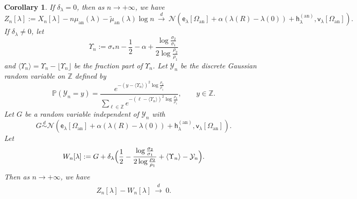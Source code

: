 \documentclass[a4paper]{article}
\newtheorem{corollary}[theorem]{Corollary}
\numberwithin{equation}{section}
\begin{document}
\begin{corollary}
\label{theorem:annular-smooth-limit-law}
If $\delta_\lambda=0$, then as $n\to+\infty$, we have
\begin{equation}
Z_n[\lambda]:=X_n[\lambda]-n\mu_{\mathrm{an}}(\lambda)
-\widetilde\mu_{\mathrm{an}}(\lambda)\log n
\ \xrightarrow{\ d\ }\
\mathcal N\!\left(
\mathsf e_\lambda[\Omega_{\mathrm{an}}]
+\alpha(\lambda(R)-\lambda(0))
+\mathsf h_\lambda^{(\mathrm{an})},
\mathsf v_\lambda[\Omega_{\mathrm{an}}]
\right).
\label{eq:annular-smooth-gaussian-limit}
\end{equation}
If $\delta_\lambda\ne0$, let 
\[
\Upsilon_n:=\sigma_{\ast}n-\frac{1}{2}-\alpha+\frac{\log\frac{\sigma_2}{\sigma_1}}{2\log \frac{\rho_2}{\rho_1}}
\]
and $\langle\Upsilon_n\rangle=\Upsilon_n-\lfloor \Upsilon_n\rfloor$ be the fraction part of $\Upsilon_n$.
Let $\mathcal{Y}_n$ be the discrete Gaussian random variable on $\mathbb{Z}$ defined by 
\begin{equation}
\mathbb P(\mathcal{Y}_n=y)  =\frac{e^{-(y-\langle\Upsilon_n\rangle)^2\log\frac{\rho_2}{\rho_1}}}{\displaystyle\sum_{\ell\in\mathbb Z}
e^{-(\ell-\langle\Upsilon_n\rangle)^2\log\frac{\rho_2}{\rho_1}}},
\qquad y\in\mathbb Z. 
\end{equation}
Let $G$ be a random variable independent of $\mathcal{Y}_n$ with
\[
G\overset{d}{\sim}\mathcal N\!\left(
\mathsf e_\lambda[\Omega_{\mathrm{an}}]
+\alpha(\lambda(R)-\lambda(0))
+\mathsf h_\lambda^{(\mathrm{an})},
\mathsf v_\lambda[\Omega_{\mathrm{an}}]
\right).
\]
Let
\begin{equation}
    W_n[\lambda]:=G+\delta_{\lambda}\Bigl(\frac{1}{2}-\frac{\log\frac{\sigma_2}{\sigma_1}}{2\log\frac{\rho_2}{\rho_1}}+\langle\Upsilon_n\rangle-\mathcal{Y}_n\Bigr).
\end{equation}
Then as $n\to+\infty$, we have 
\begin{align}
\label{def of Zn Wn}
Z_n[\lambda]
-W_n[\lambda]
\ \xrightarrow{\ d\ }\
0.
\end{align}
\end{corollary}
\end{document}
